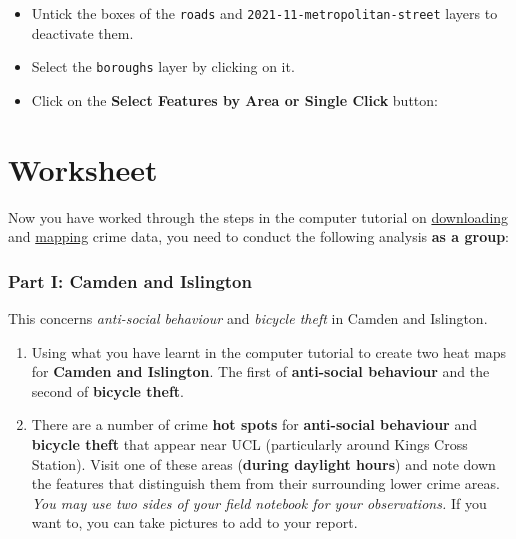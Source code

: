 \documentclass[
]{book}
\providecommand{\tightlist}{%
  \setlength{\itemsep}{0pt}\setlength{\parskip}{0pt}}
\begin{document}
\begin{itemize}
\tightlist
\item
  Untick the boxes of the \texttt{roads} and \texttt{2021-11-metropolitan-street} layers to deactivate them.
\item
  Select the \texttt{boroughs} layer by clicking on it.
\item
  Click on the \textbf{Select Features by Area or Single Click} button:
\end{itemize}

\hypertarget{worksheet}{%
\section*{Worksheet}\label{worksheet}}

Now you have worked through the steps in the computer tutorial on \protect\hyperlink{downloading-crime-data}{downloading} and \protect\hyperlink{mapping-crime-data}{mapping} crime data, you need to conduct the following analysis \textbf{as a group}:

\hypertarget{part-i-camden-and-islington}{%
\subsubsection*{Part I: Camden and Islington}\label{part-i-camden-and-islington}}

This concerns \emph{anti-social behaviour} and \emph{bicycle theft} in Camden and Islington.

\begin{enumerate}
\def\labelenumi{\arabic{enumi}.}
\tightlist
\item
  Using what you have learnt in the computer tutorial to create two heat maps for \textbf{Camden and Islington}. The first of \textbf{anti-social behaviour} and the second of \textbf{bicycle theft}.
\item
  There are a number of crime \textbf{hot spots} for \textbf{anti-social behaviour} and \textbf{bicycle theft} that appear near UCL (particularly around Kings Cross Station). Visit one of these areas (\textbf{during daylight hours}) and note down the features that distinguish them from their surrounding lower crime areas. \emph{You may use two sides of your field notebook for your observations.} If you want to, you can take pictures to add to your report.
\end{enumerate}
\end{document}
